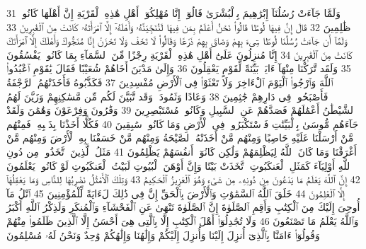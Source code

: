 {\tiny\colorbox{cl_aya}{31}} وَلَمَّا جَآءَتْ رُسُلُنَآ إِبْرَٰهِيمَ بِٱلْبُشْرَىٰ قَالُوٓا۟ إِنَّا مُهْلِكُوٓا۟ أَهْلِ هَٰذِهِ ٱلْقَرْيَةِ إِنَّ أَهْلَهَا كَانُوا۟ ظَٰلِمِينَ
{\tiny\colorbox{cl_aya}{32}} قَالَ إِنَّ فِيهَا لُوطًا قَالُوا۟ نَحْنُ أَعْلَمُ بِمَن فِيهَا لَنُنَجِّيَنَّهُۥ وَأَهْلَهُۥٓ إِلَّا ٱمْرَأَتَهُۥ كَانَتْ مِنَ ٱلْغَٰبِرِينَ
{\tiny\colorbox{cl_aya}{33}} وَلَمَّآ أَن جَآءَتْ رُسُلُنَا لُوطًا سِىٓءَ بِهِمْ وَضَاقَ بِهِمْ ذَرْعًا وَقَالُوا۟ لَا تَخَفْ وَلَا تَحْزَنْ إِنَّا مُنَجُّوكَ وَأَهْلَكَ إِلَّا ٱمْرَأَتَكَ كَانَتْ مِنَ ٱلْغَٰبِرِينَ
{\tiny\colorbox{cl_aya}{34}} إِنَّا مُنزِلُونَ عَلَىٰٓ أَهْلِ هَٰذِهِ ٱلْقَرْيَةِ رِجْزًا مِّنَ ٱلسَّمَآءِ بِمَا كَانُوا۟ يَفْسُقُونَ
{\tiny\colorbox{cl_aya}{35}} وَلَقَد تَّرَكْنَا مِنْهَآ ءَايَةًۢ بَيِّنَةً لِّقَوْمٍ يَعْقِلُونَ
{\tiny\colorbox{cl_aya}{36}} وَإِلَىٰ مَدْيَنَ أَخَاهُمْ شُعَيْبًا فَقَالَ يَٰقَوْمِ ٱعْبُدُوا۟ ٱللَّهَ وَٱرْجُوا۟ ٱلْيَوْمَ ٱلْءَاخِرَ وَلَا تَعْثَوْا۟ فِى ٱلْأَرْضِ مُفْسِدِينَ
{\tiny\colorbox{cl_aya}{37}} فَكَذَّبُوهُ فَأَخَذَتْهُمُ ٱلرَّجْفَةُ فَأَصْبَحُوا۟ فِى دَارِهِمْ جَٰثِمِينَ
{\tiny\colorbox{cl_aya}{38}} وَعَادًا وَثَمُودَا۟ وَقَد تَّبَيَّنَ لَكُم مِّن مَّسَٰكِنِهِمْ وَزَيَّنَ لَهُمُ ٱلشَّيْطَٰنُ أَعْمَٰلَهُمْ فَصَدَّهُمْ عَنِ ٱلسَّبِيلِ وَكَانُوا۟ مُسْتَبْصِرِينَ
{\tiny\colorbox{cl_aya}{39}} وَقَٰرُونَ وَفِرْعَوْنَ وَهَٰمَٰنَ وَلَقَدْ جَآءَهُم مُّوسَىٰ بِٱلْبَيِّنَٰتِ فَٱسْتَكْبَرُوا۟ فِى ٱلْأَرْضِ وَمَا كَانُوا۟ سَٰبِقِينَ
{\tiny\colorbox{cl_aya}{40}} فَكُلًّا أَخَذْنَا بِذَنۢبِهِۦ فَمِنْهُم مَّنْ أَرْسَلْنَا عَلَيْهِ حَاصِبًا وَمِنْهُم مَّنْ أَخَذَتْهُ ٱلصَّيْحَةُ وَمِنْهُم مَّنْ خَسَفْنَا بِهِ ٱلْأَرْضَ وَمِنْهُم مَّنْ أَغْرَقْنَا وَمَا كَانَ ٱللَّهُ لِيَظْلِمَهُمْ وَلَٰكِن كَانُوٓا۟ أَنفُسَهُمْ يَظْلِمُونَ
{\tiny\colorbox{cl_aya}{41}} مَثَلُ ٱلَّذِينَ ٱتَّخَذُوا۟ مِن دُونِ ٱللَّهِ أَوْلِيَآءَ كَمَثَلِ ٱلْعَنكَبُوتِ ٱتَّخَذَتْ بَيْتًا وَإِنَّ أَوْهَنَ ٱلْبُيُوتِ لَبَيْتُ ٱلْعَنكَبُوتِ لَوْ كَانُوا۟ يَعْلَمُونَ
{\tiny\colorbox{cl_aya}{42}} إِنَّ ٱللَّهَ يَعْلَمُ مَا يَدْعُونَ مِن دُونِهِۦ مِن شَىْءٍ وَهُوَ ٱلْعَزِيزُ ٱلْحَكِيمُ
{\tiny\colorbox{cl_aya}{43}} وَتِلْكَ ٱلْأَمْثَٰلُ نَضْرِبُهَا لِلنَّاسِ وَمَا يَعْقِلُهَآ إِلَّا ٱلْعَٰلِمُونَ
{\tiny\colorbox{cl_aya}{44}} خَلَقَ ٱللَّهُ ٱلسَّمَٰوَٰتِ وَٱلْأَرْضَ بِٱلْحَقِّ إِنَّ فِى ذَٰلِكَ لَءَايَةً لِّلْمُؤْمِنِينَ
{\tiny\colorbox{cl_aya}{45}} ٱتْلُ مَآ أُوحِىَ إِلَيْكَ مِنَ ٱلْكِتَٰبِ وَأَقِمِ ٱلصَّلَوٰةَ إِنَّ ٱلصَّلَوٰةَ تَنْهَىٰ عَنِ ٱلْفَحْشَآءِ وَٱلْمُنكَرِ وَلَذِكْرُ ٱللَّهِ أَكْبَرُ وَٱللَّهُ يَعْلَمُ مَا تَصْنَعُونَ
{\tiny\colorbox{cl_aya}{46}} وَلَا تُجَٰدِلُوٓا۟ أَهْلَ ٱلْكِتَٰبِ إِلَّا بِٱلَّتِى هِىَ أَحْسَنُ إِلَّا ٱلَّذِينَ ظَلَمُوا۟ مِنْهُمْ وَقُولُوٓا۟ ءَامَنَّا بِٱلَّذِىٓ أُنزِلَ إِلَيْنَا وَأُنزِلَ إِلَيْكُمْ وَإِلَٰهُنَا وَإِلَٰهُكُمْ وَٰحِدٌ وَنَحْنُ لَهُۥ مُسْلِمُونَ
